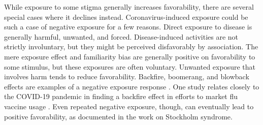 \documentclass[review]{elsarticle}
\begin{document}


While exposure to some stigma generally increases favorability, there are several special cases where it declines instead.
Coronavirus-induced exposure could be such a case of negative exposure for a few reasons.
Direct exposure to disease is generally harmful, unwanted, and forced.
Disease-induced activities are not strictly involuntary,
but they might be perceived disfavorably by association.
The mere exposure effect\cite{robinson2005novel} and familiarity bias\cite{cao2011fear}
are generally positive on favorability to some stimulus,
but these exposures are often voluntary.
Unwanted exposure that involves harm tends to reduce favorability.
Backfire, boomerang, and blowback effects are examples of a negative exposure response
\cite{swire2020searching, byrne2009boomerang, campagna2016strategic}.
One study relates closely to the COVID-19 pandemic in finding a backfire effect in efforts to market flu vaccine usage
\cite{nyhan2015does}.
Even repeated negative exposure, though, can eventually lead to positive favorability,
as documented in the work on Stockholm syndrome\cite{julich2005stockholm}.
\end{document}

